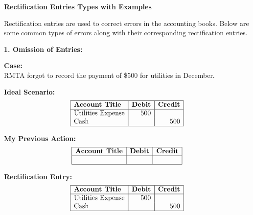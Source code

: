 \documentclass[12pt,a4paper]{book}
\begin{document}
\clearpage


\textbf{Rectification Entries Types with Examples}

Rectification entries are used to correct errors in the accounting books. Below are some common types of errors along with their corresponding rectification entries.

\vspace{0.5cm}

\textbf{1. Omission of Entries:}

\begin{multicols}{2}

\textbf{Case:} \\
RMTA forgot to record the payment of \$500 for utilities in December.

\textbf{Ideal Scenario:}
\[
\begin{array}{|l|r|r|}
\hline
\textbf{Account Title} & \textbf{Debit} & \textbf{Credit} \\
\hline
\text{Utilities Expense} & 500 & \\
\text{Cash} & & 500 \\
\hline
\end{array}
\]

\textbf{My Previous Action:}
\[
\begin{array}{|l|r|r|}
\hline
\textbf{Account Title} & \textbf{Debit} & \textbf{Credit} \\
\hline
 & & \\
\hline
\end{array}
\]

\textbf{Rectification Entry:}
\[
\begin{array}{|l|r|r|}
\hline
\textbf{Account Title} & \textbf{Debit} & \textbf{Credit} \\
\hline
\text{Utilities Expense} & 500 & \\
\text{Cash} & & 500 \\
\hline
\end{array}
\]
\end{multicols}
\vspace{0.5cm}
\end{document}
